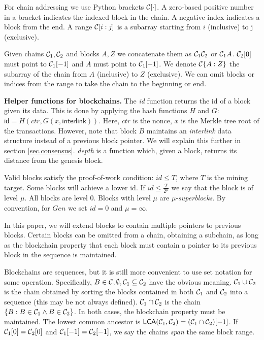 For chain addressing we use Python brackets $\mathcal{C}[\cdot]$. A zero-based
positive number in a bracket indicates the indexed block in the chain. A
negative index indicates a block from the end. A range $\mathcal{C}[i:j]$ is a
subarray starting from $i$ (inclusive) to j (exclusive).

Given chains $\mathcal{C}_1, \mathcal{C}_2$ and blocks $A, Z$ we concatenate them as
$\mathcal{C}_1 \mathcal{C}_2$ or $\mathcal{C}_1 A$. $\mathcal{C}_2[0]$ must point to $\mathcal{C}_1[-1]$
and $A$ must point to $\mathcal{C}_1[-1]$. We denote $\mathcal{C}\{A:Z\}$ the subarray of
the chain from $A$ (inclusive) to $Z$ (exclusive). We can omit blocks or indices
from the range to take the chain to the beginning or end.

\textbf{Helper functions for blockchains.} The \textit{id} function returns the id of a block
given its data. This is done by applying the hash functions $H$ and $G$:
$\textsf{id} = H(ctr, G(x, \textsf{interlink}))$. Here, $ctr$ is the nonce, $x$
is the Merkle tree root of the transactions.%
However, note
that block $B$ maintains an \textit{interlink} data structure instead of a
previous block pointer. We will explain this further in section
\ref{sec.consensus}. \textit{depth} is a function which, given a block, returns
its distance from the genesis block.

Valid blocks satisfy the proof-of-work condition: $id \leq T$, where
$T$ is the mining target. Some blocks will achieve a lower id. If $id \leq
\frac{T}{2^\mu}$ we say that the block is of level $\mu$. All blocks are
level $0$. Blocks with level $\mu$ are $\mu$-\textit{superblocks}.
By convention, for $Gen$ we set $id = 0$ and $\mu = \infty$.

In this paper, we will extend blocks to contain multiple pointers to previous
blocks. Certain blocks can be omitted from a chain, obtaining a subchain, as
long as the blockchain property that each block must contain a pointer to its
previous block in the sequence is maintained.

Blockchains are sequences, but it is still more convenient to use set notation for some operation. Specifically, $B \in \mathcal{C},
\emptyset, \mathcal{C}_1 \subseteq \mathcal{C}_2$ have the obvious meaning. $\mathcal{C}_1 \cup
\mathcal{C}_2$ is the chain obtained by sorting the blocks contained in both
$\mathcal{C}_1$ and $\mathcal{C}_2$ into a sequence (this may be not always defined).
$\mathcal{C}_1 \cap \mathcal{C}_2$ is the chain
$\{B: B \in \mathcal{C}_1 \land B \in \mathcal{C}_2\}$. In both cases, the blockchain property
must be maintained. The lowest common ancestor is $\textsf{LCA}(\mathcal{C}_1,
\mathcal{C}_2) = (\mathcal{C}_1 \cap \mathcal{C}_2)[-1]$. %
If $\mathcal{C}_1[0] = \mathcal{C}_2[0]$ and
$\mathcal{C}_1[-1] = \mathcal{C}_2[-1]$, we say the chains \textit{span} the same
block range.

